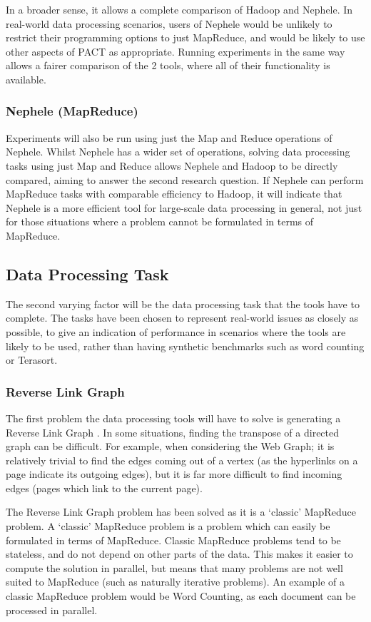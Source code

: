In a broader sense, it allows a complete comparison of Hadoop and Nephele. In real-world data processing scenarios, users of Nephele would be unlikely to restrict their programming options to just MapReduce, and would be likely to use other aspects of PACT as appropriate. Running experiments in the same way allows a fairer comparison of the 2 tools, where all of their functionality is available.

\subsubsection{Nephele (MapReduce)}
Experiments will also be run using just the Map and Reduce operations of Nephele. Whilst Nephele has a wider set of operations, solving data processing tasks using just Map and Reduce allows Nephele and Hadoop to be directly compared, aiming to answer the second research question. If Nephele can perform MapReduce tasks with comparable efficiency to Hadoop, it will indicate that Nephele is a more efficient tool for large-scale data processing in general, not just for those situations where a problem cannot be formulated in terms of MapReduce.

\subsection{Data Processing Task}
The second varying factor will be the data processing task that the tools have to complete. The tasks have been chosen to represent real-world issues as closely as possible, to give an indication of performance in scenarios where the tools are likely to be used, rather than having synthetic benchmarks such as word counting or Terasort. 

\subsubsection{Reverse Link Graph}
The first problem the data processing tools will have to solve is generating a Reverse Link Graph \cite{dean2008mapreduce}. In some situations, finding the transpose of a directed graph can be difficult. For example, when considering the Web Graph; it is relatively trivial to find the edges coming out of a vertex (as the hyperlinks on a page indicate its outgoing edges), but it is far more difficult to find incoming edges (pages which link to the current page). 

The Reverse Link Graph problem has been solved as it is a `classic' MapReduce problem. A `classic' MapReduce problem is a problem which can easily be formulated in terms of MapReduce. Classic MapReduce problems tend to be stateless, and do not depend on other parts of the data. This makes it easier to compute the solution in parallel, but means that many problems are not well suited to MapReduce (such as naturally iterative problems). An example of a classic MapReduce problem would be Word Counting, as each document can be processed in parallel. 

